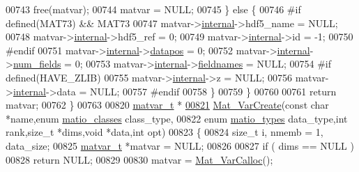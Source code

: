 \begin{DoxyCode}
{{{{{{{{{{{{{{{{{{{{{00743             free(matvar);
00744             matvar = NULL;
00745         \} \textcolor{keywordflow}{else} \{
00746 \textcolor{preprocessor}{#if defined(MAT73) && MAT73}
00747             matvar->\hyperlink{group___m_a_t_a6e97e3ed9f40c49322c18561c2a94e92}{internal}->hdf5\_name  = NULL;
00748             matvar->\hyperlink{group___m_a_t_a6e97e3ed9f40c49322c18561c2a94e92}{internal}->hdf5\_ref   =  0;
00749             matvar->\hyperlink{group___m_a_t_a6e97e3ed9f40c49322c18561c2a94e92}{internal}->id         = -1;
00750 \textcolor{preprocessor}{#endif}
00751             matvar->\hyperlink{group___m_a_t_a6e97e3ed9f40c49322c18561c2a94e92}{internal}->\hyperlink{structmatvar__internal_afd3bfaab126a160bd6855563e1ea0a7e}{datapos}    = 0;
00752             matvar->\hyperlink{group___m_a_t_a6e97e3ed9f40c49322c18561c2a94e92}{internal}->\hyperlink{structmatvar__internal_a93fc447484f455eddf9334f2e9e411c2}{num\_fields} = 0;
00753             matvar->\hyperlink{group___m_a_t_a6e97e3ed9f40c49322c18561c2a94e92}{internal}->\hyperlink{structmatvar__internal_a7574d000bfc98ad4860ae6590b8d4985}{fieldnames} = NULL;
00754 \textcolor{preprocessor}{#if defined(HAVE\_ZLIB)}
00755             matvar->\hyperlink{group___m_a_t_a6e97e3ed9f40c49322c18561c2a94e92}{internal}->z          = NULL;
00756             matvar->\hyperlink{group___m_a_t_a6e97e3ed9f40c49322c18561c2a94e92}{internal}->data       = NULL;
00757 \textcolor{preprocessor}{#endif}
00758         \}
00759     \}
00760 
00761     \textcolor{keywordflow}{return} matvar;
00762 \}
00763 
00820 \hyperlink{group___m_a_t_structmatvar__t}{matvar\_t} *
\hyperlink{group___m_a_t_ga1c54a84bb4d810c6fccdb8869489eac4}{00821} \hyperlink{group___m_a_t_ga1c54a84bb4d810c6fccdb8869489eac4}{Mat\_VarCreate}(\textcolor{keyword}{const} \textcolor{keywordtype}{char} *name,\textcolor{keyword}{enum} \hyperlink{group___m_a_t_gad4d60ae7b709fc81bfd744fb4c857c40}{matio\_classes} class\_type,
00822     \textcolor{keyword}{enum} \hyperlink{group___m_a_t_gacf7b3b879282b7ab3a51190e49bf3453}{matio\_types} data\_type,\textcolor{keywordtype}{int} rank,\textcolor{keywordtype}{size\_t} *dims,\textcolor{keywordtype}{void} *data,\textcolor{keywordtype}{int} opt)
00823 \{
00824     \textcolor{keywordtype}{size\_t} i, nmemb = 1, data\_size;
00825     \hyperlink{group___m_a_t_structmatvar__t}{matvar\_t} *matvar = NULL;
00826 
00827     \textcolor{keywordflow}{if} ( dims == NULL )
00828         \textcolor{keywordflow}{return} NULL;
00829 
00830     matvar = \hyperlink{group___m_a_t_gae7c9c3699f6e9c31a9c490300013098c}{Mat\_VarCalloc}();
}}}}}}}}}}}}}}}}}}}}}
\end{DoxyCode}
